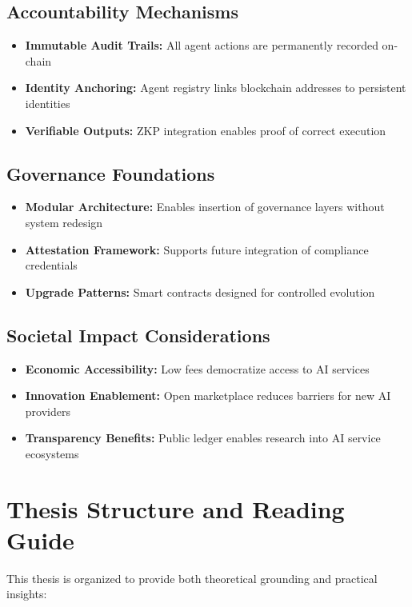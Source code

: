 \subsection{Accountability Mechanisms}
\begin{itemize}
    \item \textbf{Immutable Audit Trails:} All agent actions are permanently recorded on-chain
    \item \textbf{Identity Anchoring:} Agent registry links blockchain addresses to persistent identities
    \item \textbf{Verifiable Outputs:} ZKP integration enables proof of correct execution
\end{itemize}

\subsection{Governance Foundations}
\begin{itemize}
    \item \textbf{Modular Architecture:} Enables insertion of governance layers without system redesign
    \item \textbf{Attestation Framework:} Supports future integration of compliance credentials
    \item \textbf{Upgrade Patterns:} Smart contracts designed for controlled evolution
\end{itemize}

\subsection{Societal Impact Considerations}
\begin{itemize}
    \item \textbf{Economic Accessibility:} Low fees democratize access to AI services
    \item \textbf{Innovation Enablement:} Open marketplace reduces barriers for new AI providers
    \item \textbf{Transparency Benefits:} Public ledger enables research into AI service ecosystems
\end{itemize}

\section{Thesis Structure and Reading Guide}

This thesis is organized to provide both theoretical grounding and practical insights:


